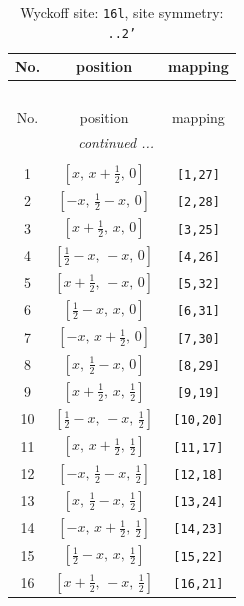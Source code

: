 \documentclass[fleqn,8pt]{jsarticle}
\begin{document}
\renewcommand{\arraystretch}{1.2}
\begin{longtable}{ccc}
\caption{Wyckoff site: {\tt 16l}, site symmetry: {\tt ..2'}}
 \\
 \hline \hline
No. & position & mapping \\ \hline \endfirsthead

\multicolumn{2}{l}{\tablename\ \thetable{}} \\
 \hline \hline
No. & position & mapping \\ \hline \endhead

 \hline \hline
\multicolumn{2}{r}{\footnotesize\it continued ...} \\ \endfoot

 \hline \hline
\multicolumn{2}{r}{} \\ \endlastfoot

1 & $\left[ x,\, x + \frac{1}{2},\, 0 \right]$ & {\tt [1,27]} \\ \hline
2 & $\left[ - x,\, \frac{1}{2} - x,\, 0 \right]$ & {\tt [2,28]} \\ \hline
3 & $\left[ x + \frac{1}{2},\, x,\, 0 \right]$ & {\tt [3,25]} \\ \hline
4 & $\left[ \frac{1}{2} - x,\, - x,\, 0 \right]$ & {\tt [4,26]} \\ \hline
5 & $\left[ x + \frac{1}{2},\, - x,\, 0 \right]$ & {\tt [5,32]} \\ \hline
6 & $\left[ \frac{1}{2} - x,\, x,\, 0 \right]$ & {\tt [6,31]} \\ \hline
7 & $\left[ - x,\, x + \frac{1}{2},\, 0 \right]$ & {\tt [7,30]} \\ \hline
8 & $\left[ x,\, \frac{1}{2} - x,\, 0 \right]$ & {\tt [8,29]} \\ \hline
9 & $\left[ x + \frac{1}{2},\, x,\, \frac{1}{2} \right]$ & {\tt [9,19]} \\ \hline
10 & $\left[ \frac{1}{2} - x,\, - x,\, \frac{1}{2} \right]$ & {\tt [10,20]} \\ \hline
11 & $\left[ x,\, x + \frac{1}{2},\, \frac{1}{2} \right]$ & {\tt [11,17]} \\ \hline
12 & $\left[ - x,\, \frac{1}{2} - x,\, \frac{1}{2} \right]$ & {\tt [12,18]} \\ \hline
13 & $\left[ x,\, \frac{1}{2} - x,\, \frac{1}{2} \right]$ & {\tt [13,24]} \\ \hline
14 & $\left[ - x,\, x + \frac{1}{2},\, \frac{1}{2} \right]$ & {\tt [14,23]} \\ \hline
15 & $\left[ \frac{1}{2} - x,\, x,\, \frac{1}{2} \right]$ & {\tt [15,22]} \\ \hline
16 & $\left[ x + \frac{1}{2},\, - x,\, \frac{1}{2} \right]$ & {\tt [16,21]} \\
\end{longtable}
\end{document}
